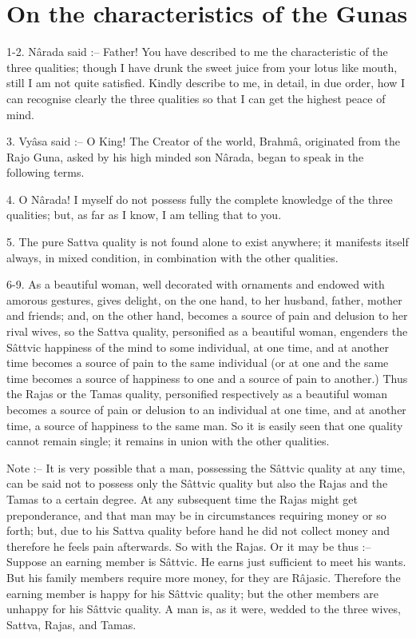 ﻿\chapter{On the characteristics of the Gunas}

1-2. N\^arada said :-- Father! You have described to me the characteristic of the three qualities; though I have drunk the sweet juice from your lotus like mouth, still I am not quite satisfied. Kindly describe to me, in detail, in due order, how I can recognise clearly the three qualities so that I can get the highest peace of mind.

3. Vy\^asa said :-- O King! The Creator of the world, Brahm\^a, originated from the Rajo Guna, asked by his high minded son N\^arada, began to speak in the following terms.

4. O N\^arada! I myself do not possess fully the complete knowledge of the three qualities; but, as far as I know, I am telling that to you.

5. The pure Sattva quality is not found alone to exist anywhere; it manifests itself always, in mixed condition, in combination with the other qualities.

6-9. As a beautiful woman, well decorated with ornaments and endowed with amorous gestures, gives delight, on the one hand, to her husband, father, mother and friends; and, on the other hand, becomes a source of pain and delusion to her rival wives, so the Sattva quality, personified as a beautiful woman, engenders the S\^attvic happiness of the mind to some individual, at one time, and at another time becomes a source of pain to the same individual (or at one and the same time becomes a source of happiness to one and a source of pain to another.) Thus the Rajas or the Tamas quality, personified respectively as a beautiful woman becomes a source of pain or delusion to an individual at one time, and at another time, a source of happiness to the same man. So it is easily seen that one quality cannot remain single; it remains in union with the other qualities.

Note :-- It is very possible that a man, possessing the S\^attvic quality at any time, can be said not to possess only the S\^attvic quality but also the Rajas and the Tamas to a certain degree. At any subsequent time the Rajas might get preponderance, and that man may be in circumstances requiring money or so forth; but, due to his Sattva quality before hand he did not collect money and therefore he feels pain afterwards. So with the Rajas. Or it may be thus :-- Suppose an earning member is S\^attvic. He earns just sufficient to meet his wants. But his family members require more money, for they are R\^ajasic. Therefore the earning member is happy for his S\^attvic quality; but the other members are unhappy for his S\^attvic quality. A man is, as it were, wedded to the three wives, Sattva, Rajas, and Tamas.

